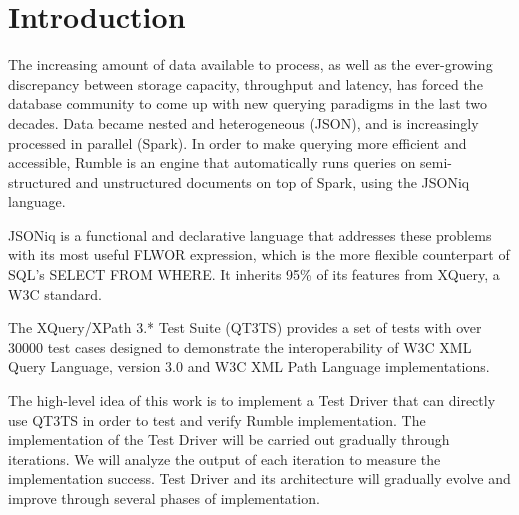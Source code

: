 
\chapter{Introduction}
\label{chapter:introduction}
The increasing amount of data available to process, as well as the ever-growing discrepancy between storage capacity, throughput and latency, has forced the database community to come up with new querying paradigms in the last two decades. Data became nested and heterogeneous (JSON), and is increasingly processed in parallel (Spark). In order to make querying more efficient and accessible, Rumble \cite{RumblePaper} is an engine that automatically runs queries on semi-structured and unstructured documents on top of Spark, using the JSONiq language. 

JSONiq \cite{JSONIQORG}is a functional and declarative language that addresses these problems with its most useful FLWOR expression, which is the more flexible counterpart of SQL’s SELECT FROM WHERE. It inherits 95\% of its features from XQuery, a W3C standard.

The XQuery/XPath 3.* Test Suite (QT3TS) \cite{TestSuite} provides a set of tests with over 30000 test cases designed to demonstrate the interoperability of W3C XML Query Language, version 3.0 and W3C XML Path Language implementations.

The high-level idea of this work is to implement a Test Driver that can directly use QT3TS in order to test and verify Rumble implementation. The implementation of the Test Driver will be carried out gradually through iterations. We will analyze the output of each iteration to measure the implementation success. Test Driver and its architecture will gradually evolve and improve through several phases of implementation. 